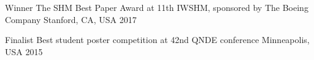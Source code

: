 


\begin{cvhonors}

  \cvhonor
    {Winner} %
    {The SHM Best Paper Award at 11th IWSHM, sponsored by The Boeing Company} %
    {Stanford, CA, USA} %
    {2017} %

  \cvhonor
    {Finalist} %
    {Best student poster competition at 42nd QNDE conference} %
    {Minneapolis, USA} %
    {2015} %

\end{cvhonors}


